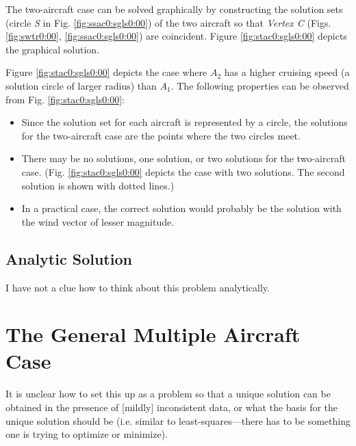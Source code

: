 \documentclass[letterpaper,10pt,titlepage]{article}
\begin{document}
The two-aircraft case can be solved graphically by constructing the
solution sets (circle \emph{S} in Fig. \ref{fig:ssac0:sgls0:00}) 
of the two aircraft so that \emph{Vertex C}
(Figs. \ref{fig:swtr0:00}, \ref{fig:ssac0:sgls0:00}) are coincident.
Figure \ref{fig:stac0:sgls0:00} depicts the graphical solution.

Figure \ref{fig:stac0:sgls0:00} depicts the case where 
$A_2$ has a higher cruising speed (a solution circle of larger
radius) than $A_1$.  The following properties can be
observed from Fig. \ref{fig:stac0:sgls0:00}:

\begin{itemize}
\item Since the solution set for each aircraft is represented by a circle,
      the solutions for the two-aircraft case are the points where the two
      circles meet.
\item There may be no solutions, one solution, or two solutions for the
      two-aircraft case.  (Fig. \ref{fig:stac0:sgls0:00}
      depicts the case with two solutions.  The second solution is shown
      with dotted lines.)
\item In a practical case, the correct solution would probably be the
      solution with the wind vector of lesser magnitude.
\end{itemize}


\subsection{Analytic Solution}
\label{stac0:sasl0}

I have not a clue how to think about this problem analytically.


\section{The General Multiple Aircraft Case}
\label{smac0}

It is unclear how to set this up as a problem so that a unique solution
can be obtained in the presence of [mildly] inconsistent data, or what the basis
for the unique solution should be (i.e. similar to least-squares---there has
to be something one is trying to optimize or minimize).


\end{document}
